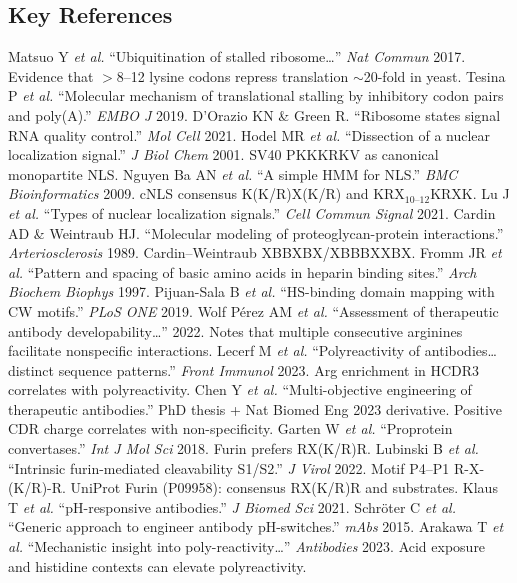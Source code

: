 \subsection*{Key References}
\begin{thebibliography}{99}\setlength{\itemsep}{1pt}
 Matsuo Y \textit{et al.} “Ubiquitination of stalled ribosome…” \textit{Nat Commun} 2017. Evidence that $>$8–12 lysine codons repress translation $\sim$20-fold in yeast.
 Tesina P \textit{et al.} “Molecular mechanism of translational stalling by inhibitory codon pairs and poly(A).” \textit{EMBO J} 2019.
 D’Orazio KN \& Green R. “Ribosome states signal RNA quality control.” \textit{Mol Cell} 2021.
 Hodel MR \textit{et al.} “Dissection of a nuclear localization signal.” \textit{J Biol Chem} 2001. SV40 PKKKRKV as canonical monopartite NLS.
 Nguyen Ba AN \textit{et al.} “A simple HMM for NLS.” \textit{BMC Bioinformatics} 2009. cNLS consensus K(K/R)X(K/R) and KRX$_{10–12}$KRXK.
 Lu J \textit{et al.} “Types of nuclear localization signals.” \textit{Cell Commun Signal} 2021.
 Cardin AD \& Weintraub HJ. “Molecular modeling of proteoglycan-protein interactions.” \textit{Arteriosclerosis} 1989. Cardin–Weintraub XBBXBX/XBBBXXBX.
 Fromm JR \textit{et al.} “Pattern and spacing of basic amino acids in heparin binding sites.” \textit{Arch Biochem Biophys} 1997.
 Pijuan-Sala B \textit{et al.} “HS-binding domain mapping with CW motifs.” \textit{PLoS ONE} 2019.
 Wolf Pérez AM \textit{et al.} “Assessment of therapeutic antibody developability…” 2022. Notes that multiple consecutive arginines facilitate nonspecific interactions.
 Lecerf M \textit{et al.} “Polyreactivity of antibodies… distinct sequence patterns.” \textit{Front Immunol} 2023. Arg enrichment in HCDR3 correlates with polyreactivity.
 Chen Y \textit{et al.} “Multi-objective engineering of therapeutic antibodies.” PhD thesis + Nat Biomed Eng 2023 derivative. Positive CDR charge correlates with non-specificity.
 Garten W \textit{et al.} “Proprotein convertases.” \textit{Int J Mol Sci} 2018. Furin prefers RX(K/R)R.
 Lubinski B \textit{et al.} “Intrinsic furin-mediated cleavability S1/S2.” \textit{J Virol} 2022. Motif P4–P1 R-X-(K/R)-R.
 UniProt Furin (P09958): consensus RX(K/R)R and substrates.
 Klaus T \textit{et al.} “pH-responsive antibodies.” \textit{J Biomed Sci} 2021.
 Schröter C \textit{et al.} “Generic approach to engineer antibody pH-switches.” \textit{mAbs} 2015.
 Arakawa T \textit{et al.} “Mechanistic insight into poly-reactivity…” \textit{Antibodies} 2023. Acid exposure and histidine contexts can elevate polyreactivity.
\end{thebibliography}

